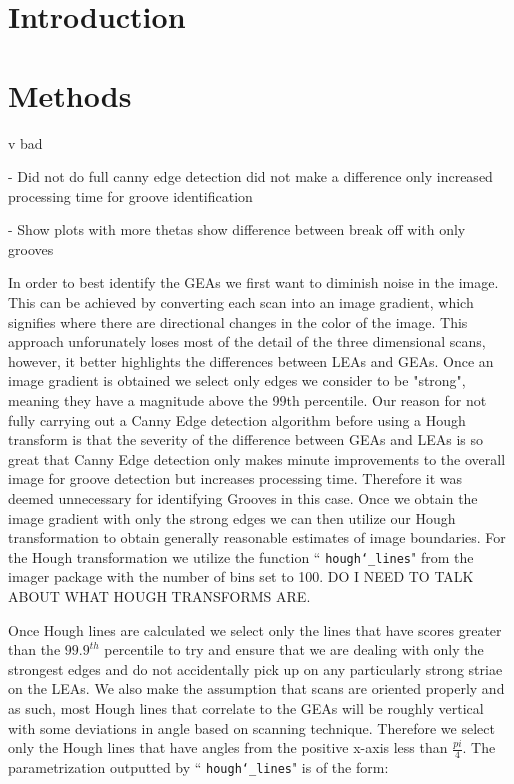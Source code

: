 \documentclass[12pt]{article}
\theoremstyle{nonumberplain}
\begin{document}


\section{Introduction}

\section{Methods}

v bad

- Did not do full canny edge detection did not make a difference only increased processing time for groove identification

- Show plots with more thetas show difference between break off with only grooves


In order to best identify the GEAs we first want to diminish noise in the image. This can be achieved by converting each scan into an image gradient, which signifies where there are directional changes in the color of the image. This approach unforunately loses most of the detail of the three dimensional scans, however, it better highlights the differences between LEAs and GEAs. Once an image gradient is obtained we select only edges we consider to be "strong", meaning they have a magnitude above the 99th percentile. Our reason for not fully carrying out a Canny Edge detection algorithm before using a Hough transform is that the severity of the difference between GEAs and LEAs is so great that Canny Edge detection only makes minute improvements to the overall image for groove detection but increases processing time. Therefore it was deemed unnecessary for identifying Grooves in this case. Once we obtain the image gradient with only the strong edges we can then utilize our Hough transformation to obtain generally reasonable estimates of image boundaries. For the Hough transformation we utilize the function `` \texttt{hough\char`_lines}" from the imager package with the number of bins set to 100. DO I NEED TO TALK ABOUT WHAT HOUGH TRANSFORMS ARE. 

Once Hough lines are calculated we select only the lines that have scores greater than the $99.9^{th}$ percentile to try and ensure that we are dealing with only the strongest edges and do not accidentally pick up on any particularly strong striae on the LEAs. We also make the assumption that scans are oriented properly and as such, most Hough lines that correlate to the GEAs will be roughly vertical with some deviations in angle based on scanning technique. Therefore we select only the Hough lines that have angles from the positive x-axis less than $\frac{pi}{4}$. The parametrization outputted by `` \texttt{hough\char`_lines}" is of the form:
\end{document}

